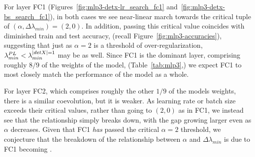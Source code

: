 For layer FC1 (Figures~\ref{fig:mlp3-detx-lr_search_fc1} and~\ref{fig:mlp3-detx-bs_search_fc1}), in both cases we see near-linear march towards the critical tuple of $(\alpha, \Delta\lambda_{min}) = (2, 0)$.
In addition, passing this critical value coincides with diminished train and test accuracy, (recall 
Figure~\ref{fig:mlp3-accuracies}), suggesting that just as $\alpha=2$ is a threshold of over-regularization, $\lambda^{PL}_{min} < \lambda^{\vert detX\vert=1}_{min}$ may be as well. 
Since FC1 is the dominant layer, comprising roughly $8/9$ of the weights of the model, (Table~\ref{tab:mlp3},) we expect 
FC1 to most closely match the performance of the model as a whole.

For layer FC2, which comprises roughly the other $1/9$ of the models weights, there is a similar coevolution, but it is weaker. 
As learning rate or batch size exceeds their critical values, rather than going to $(2, 0)$ as in FC1, we instead see that the relationship simply breaks down, with the gap growing larger even as $\alpha$ decreases. 
Given that FC1 \emph{has} passed the critical $\alpha=2$ threshold, we conjecture that the breakdown of the relationship between $\alpha$ and $\Delta \lambda_{min}$ is due to FC1 becoming \ATypical.


